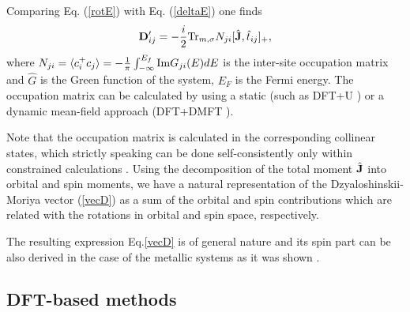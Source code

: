 \documentclass[aps,prl,twocolumn,showpacs,amsmath,amssymb]{revtex4-1}
\begin{document}
Comparing Eq. (\ref{rotE}) with Eq. (\ref{deltaE}) one finds
\begin{eqnarray}
\mathbf{D}^{\prime}_{ij}  = -\frac{i}{2} {\rm Tr}_{m,
\sigma} N_{ji} [\hat {\bf J}, \hat t_{ij}]_{+}, \label{vecD}
\end{eqnarray}
where $N_{ji} =\langle c^{+}_{i} c_{j} \rangle= -\frac{1}{\pi}
\int_{-\infty}^{E_{f}} {\rm Im} G_{ji} (E) dE$ is the inter-site occupation matrix
and $\hat G$ is the Green function of the system, $E_F$ is the Fermi energy.
The occupation matrix can be calculated by using a static (such as DFT+U \cite{LDAU}) or a dynamic mean-field approach (DFT+DMFT \cite{LDA+DMFT, kotliar-DMFT, Anisimov}).

Note that the occupation matrix is
calculated in the corresponding collinear states, which strictly
speaking can be done self-consistently only within constrained
calculations \cite{stocks}. Using the decomposition of the total
moment $\hat {\bf J}$ into orbital and spin moments, we have a
natural representation of the Dzyaloshinskii-Moriya vector
(\ref{vecD}) as a sum of the orbital and spin contributions which are related with the rotations
in orbital and spin space, respectively.

The resulting expression Eq.\ref{vecD} is of general nature and its spin part can be also derived in the case of the metallic systems as it was shown  \cite{Tatara}.


\subsection{DFT-based methods}
\end{document}
